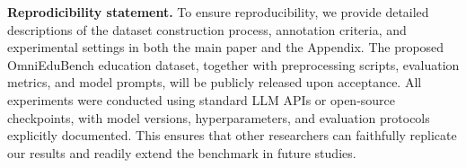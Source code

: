 \documentclass{article} %
\begin{document}
\textbf{Reprodicibility statement.}
To ensure reproducibility, we provide detailed descriptions of the dataset construction process, annotation criteria, and experimental settings in both the main paper and the Appendix. The proposed OmniEduBench education dataset, together with preprocessing scripts, evaluation metrics, and model prompts, will be publicly released upon acceptance. All experiments were conducted using standard LLM APIs or open-source checkpoints, with model versions, hyperparameters, and evaluation protocols explicitly documented. This ensures that other researchers can faithfully replicate our results and readily extend the benchmark in future studies.




\appendix



\end{document}

